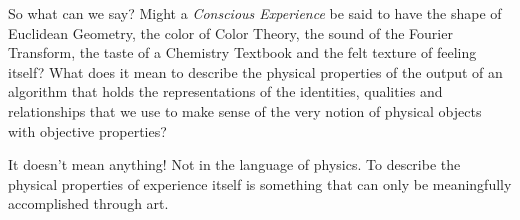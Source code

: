 \documentclass[runningheads]{llncs}
\begin{document}
So what can we say? Might a \emph{Conscious Experience} be said to have the shape of Euclidean Geometry, the color of Color Theory, the sound of the Fourier Transform, the taste of a Chemistry Textbook and the felt texture of feeling itself? What does it mean to describe the physical properties of the output of an algorithm that holds the representations of the identities, qualities and relationships that we use to make sense of the very notion of physical objects with objective properties?

It doesn't mean anything! Not in the language of physics. To describe the physical properties of experience itself is something that can only be meaningfully accomplished through art\cite{Hofstadter1979}.

\end{document}
